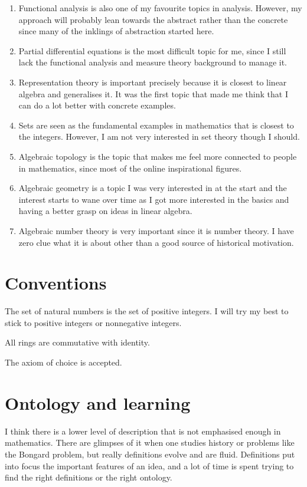\documentclass{tufte-book}
\begin{document}
\begin{enumerate}
  \item Functional analysis is also one of my favourite topics in analysis. However, my approach will probably lean towards the abstract rather than the concrete since many of the inklings of abstraction started here.
  \item Partial differential equations is the most difficult topic for me, since I still lack the functional analysis and measure theory background to manage it.
  \item Representation theory is important precisely because it is closest to linear algebra and generalises it. It was the first topic that made me think that I can do a lot better with concrete examples.
  \item Sets are seen as the fundamental examples in mathematics that is closest to the integers. However, I am not very interested in set theory though I should.
  \item Algebraic topology is the topic that makes me feel more connected to people in mathematics, since most of the online inspirational figures.
  \item Algebraic geometry is a topic I was very interested in at the start and the interest starts to wane over time as I got more interested in the basics and having a better grasp on ideas in linear algebra.
  \item Algebraic number theory is very important since it is number theory. I have zero clue what it is about other than a good source of historical motivation.
\end{enumerate}

\section{Conventions}

The set of natural numbers is the set of positive integers.
I will try my best to stick to positive integers or nonnegative integers.

All rings are commutative with identity.

The axiom of choice is accepted.

\section{Ontology and learning}

I think there is a lower level of description that is not emphasised enough in mathematics. There are glimpses of it when one studies history or problems like the Bongard problem, but really definitions evolve and are fluid. Definitions put into focus the important features of an idea, and a lot of time is spent trying to find the right definitions or the right ontology.
\end{document}
